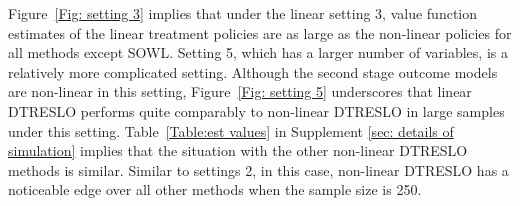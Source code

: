 \documentclass[preprint] {imsart}
\begin{document}
Figure~\ref{Fig: setting 3} implies that under the linear setting 3,  value function estimates of the linear treatment policies are as large as  the non-linear policies for all methods except SOWL. Setting 5, which has a larger number of variables, is a relatively more complicated setting.  Although the second stage outcome models are  non-linear in this setting, Figure~\ref{Fig: setting 5} underscores  that  linear DTRESLO performs quite  comparably to non-linear DTRESLO in large samples under this setting. Table~\ref{Table:est values} in Supplement \ref{sec: details of simulation} implies that the situation with the other non-linear DTRESLO methods is similar. Similar to settings 2, in this case, non-linear DTRESLO has a noticeable edge over all other methods when the sample size is 250.

\end{document}

